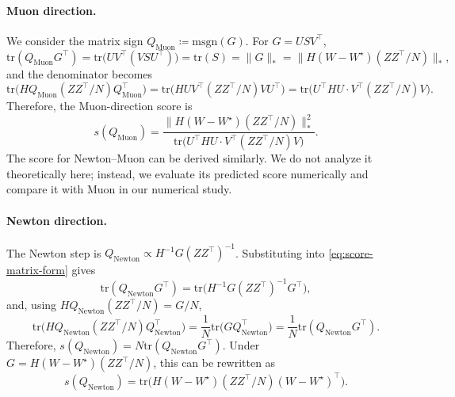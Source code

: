 \documentclass[11pt]{article}
\begin{document}
\paragraph{Muon direction.}
We consider the matrix sign \( {Q}_{\mathrm{Muon}}  \coloneqq  \mathrm{msgn}(G) \). For $G=USV^\top$,
\[
  \mathrm{tr}({Q}_{\mathrm{Muon}}{G}^\top)
   = 
  \mathrm{tr} \big({U}{V}^\top ({V}S {U}^\top)\big)
   = 
  \mathrm{tr}(S)
   = 
  \|{G}\|_\ast
   = 
  \big\|{H} ({W}-W^\star) ({Z}{Z}^\top/N)\big\|_\ast,
\]
and the denominator becomes
\[
  \mathrm{tr} \Big({H} {Q}_{\mathrm{Muon}} ({Z}{Z}^\top/N) {Q}_{\mathrm{Muon}}^\top\Big)
   = 
  \mathrm{tr} \Big({H} {U} {V}^\top({Z}{Z}^\top/N){V} {U}^\top\Big)
   = 
  \mathrm{tr} \Big({U}^\top {H} {U}  \cdot  {V}^\top({Z}{Z}^\top/N){V}\Big).
\]
Therefore, the Muon-direction score is
\begin{equation}
  \label{eq:score-muon-deterministic}
  s ({Q}_{\mathrm{Muon}})
   = 
  \frac{
    \big\|{H} ({W}-W^\star) ({Z}{Z}^\top/N)\big\|_\ast^{ 2}
  }{
    \mathrm{tr} \Big({U}^\top {H} {U}  \cdot  {V}^\top({Z}{Z}^\top/N){V}\Big)
  }.
\end{equation}
The score for Newton--Muon can be derived similarly. We do not analyze it theoretically here; instead, we evaluate its predicted score numerically and compare it with Muon in our numerical study.

\paragraph{Newton direction.}
The Newton step is \( {Q}_{\mathrm{Newton}} \propto {H}^{-1} {G} ({Z}{Z}^\top)^{-1} \). Substituting into
\eqref{eq:score-matrix-form} gives
\[
  \mathrm{tr}({Q}_{\mathrm{Newton}}{G}^\top)
   = 
  \mathrm{tr} \big({H}^{-1}{G}({Z}{Z}^\top)^{-1}{G}^\top\big),
\]
and, using ${H} {Q}_{\mathrm{Newton}}({Z}{Z}^\top/N)={G}/N$,
\[
  \mathrm{tr} \Big({H} {Q}_{\mathrm{Newton}} ({Z}{Z}^\top/N) {Q}_{\mathrm{Newton}}^\top\Big)
   = 
  \frac{1}{N}\mathrm{tr} \big({G} {Q}_{\mathrm{Newton}}^\top\big)
   = 
  \frac{1}{N}\mathrm{tr}({Q}_{\mathrm{Newton}}{G}^\top).
\]
Therefore, \( s ({Q}_{\mathrm{Newton}})
   = 
  N \mathrm{tr}({Q}_{\mathrm{Newton}}{G}^\top)\).
Under ${G}={H} ({W}-W^\star) ({Z}{Z}^\top/N)$, this can be rewritten as
\begin{equation}
  \label{eq:score-newton-displacement}
  s ({Q}_{\mathrm{Newton}})
   = 
  \mathrm{tr} \Big({H} ({W}-W^\star) ({Z}{Z}^\top/N) ({W}-W^\star)^\top\Big).
\end{equation}
\end{document}
